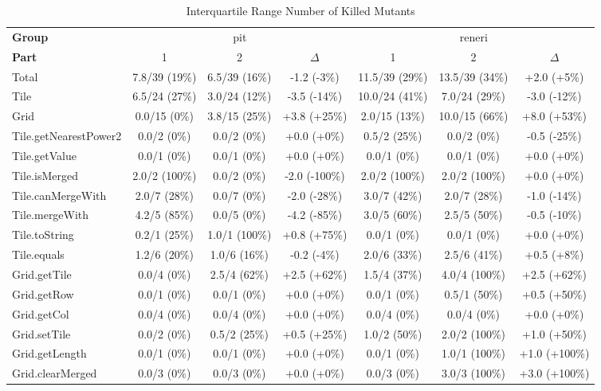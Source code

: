 \begin{sidewaystable}
\centering
\caption{Interquartile Range Number of Killed Mutants}
\label{tab:interquartile_range_number_of_killed_mutants}
\begin{tabular}{lcccccc}
\toprule
\textbf{Group} & \multicolumn{3}{c}{pit} & \multicolumn{3}{c}{reneri} \\
\textbf{Part} & 1 & 2 & $\Delta$ & 1 & 2 & $\Delta$ \\
\cmidrule(lr){1-1} \cmidrule(lr){2-4} \cmidrule(lr){5-7}
Total & 7.8/39 (19\%) & 6.5/39 (16\%) & -1.2 (-3\%) & 11.5/39 (29\%) & 13.5/39 (34\%) & +2.0 (+5\%) \\
\cmidrule(lr){1-1} \cmidrule(lr){2-4} \cmidrule(lr){5-7}
Tile & 6.5/24 (27\%) & 3.0/24 (12\%) & -3.5 (-14\%) & 10.0/24 (41\%) & 7.0/24 (29\%) & -3.0 (-12\%) \\
Grid & 0.0/15 (0\%) & 3.8/15 (25\%) & +3.8 (+25\%) & 2.0/15 (13\%) & 10.0/15 (66\%) & +8.0 (+53\%) \\
\cmidrule(lr){1-1} \cmidrule(lr){2-4} \cmidrule(lr){5-7}
Tile.getNearestPower2 & 0.0/2 (0\%) & 0.0/2 (0\%) & +0.0 (+0\%) & 0.5/2 (25\%) & 0.0/2 (0\%) & -0.5 (-25\%) \\
Tile.getValue & 0.0/1 (0\%) & 0.0/1 (0\%) & +0.0 (+0\%) & 0.0/1 (0\%) & 0.0/1 (0\%) & +0.0 (+0\%) \\
Tile.isMerged & 2.0/2 (100\%) & 0.0/2 (0\%) & -2.0 (-100\%) & 2.0/2 (100\%) & 2.0/2 (100\%) & +0.0 (+0\%) \\
Tile.canMergeWith & 2.0/7 (28\%) & 0.0/7 (0\%) & -2.0 (-28\%) & 3.0/7 (42\%) & 2.0/7 (28\%) & -1.0 (-14\%) \\
Tile.mergeWith & 4.2/5 (85\%) & 0.0/5 (0\%) & -4.2 (-85\%) & 3.0/5 (60\%) & 2.5/5 (50\%) & -0.5 (-10\%) \\
Tile.toString & 0.2/1 (25\%) & 1.0/1 (100\%) & +0.8 (+75\%) & 0.0/1 (0\%) & 0.0/1 (0\%) & +0.0 (+0\%) \\
Tile.equals & 1.2/6 (20\%) & 1.0/6 (16\%) & -0.2 (-4\%) & 2.0/6 (33\%) & 2.5/6 (41\%) & +0.5 (+8\%) \\
Grid.getTile & 0.0/4 (0\%) & 2.5/4 (62\%) & +2.5 (+62\%) & 1.5/4 (37\%) & 4.0/4 (100\%) & +2.5 (+62\%) \\
Grid.getRow & 0.0/1 (0\%) & 0.0/1 (0\%) & +0.0 (+0\%) & 0.0/1 (0\%) & 0.5/1 (50\%) & +0.5 (+50\%) \\
Grid.getCol & 0.0/4 (0\%) & 0.0/4 (0\%) & +0.0 (+0\%) & 0.0/4 (0\%) & 0.0/4 (0\%) & +0.0 (+0\%) \\
Grid.setTile & 0.0/2 (0\%) & 0.5/2 (25\%) & +0.5 (+25\%) & 1.0/2 (50\%) & 2.0/2 (100\%) & +1.0 (+50\%) \\
Grid.getLength & 0.0/1 (0\%) & 0.0/1 (0\%) & +0.0 (+0\%) & 0.0/1 (0\%) & 1.0/1 (100\%) & +1.0 (+100\%) \\
Grid.clearMerged & 0.0/3 (0\%) & 0.0/3 (0\%) & +0.0 (+0\%) & 0.0/3 (0\%) & 3.0/3 (100\%) & +3.0 (+100\%) \\
\bottomrule
\end{tabular}
\end{sidewaystable}
